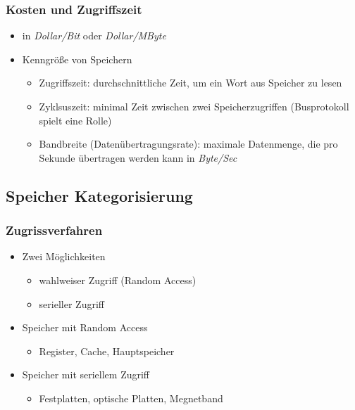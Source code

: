 		\subsubsection{Kosten und Zugriffszeit}
			\begin{itemize}
				\item in \textit{Dollar/Bit} oder \textit{Dollar/MByte}
				\item Kenngrö\ss e von Speichern
					\begin{itemize}
						\item Zugriffszeit: durchschnittliche Zeit, um ein Wort aus Speicher zu lesen
						\item Zyklsuszeit: minimal Zeit zwischen zwei Speicherzugriffen (Busprotokoll spielt eine Rolle)
						\item Bandbreite (Datenübertragungsrate): maximale Datenmenge, die pro Sekunde übertragen werden
							kann in \textit{Byte/Sec}
					\end{itemize}
			\end{itemize}


	\subsection{Speicher Kategorisierung}
		\subsubsection{Zugrissverfahren}
			\begin{itemize}
				\item Zwei Möglichkeiten
					\begin{itemize}
						\item wahlweiser Zugriff (Random Access)
						\item serieller Zugriff
					\end{itemize}
				\item Speicher mit Random Access
					\begin{itemize}
						\item Register, Cache, Hauptspeicher
					\end{itemize}
				\item Speicher mit seriellem Zugriff
					\begin{itemize}
						\item Festplatten, optische Platten, Megnetband
					\end{itemize}
			\end{itemize}

